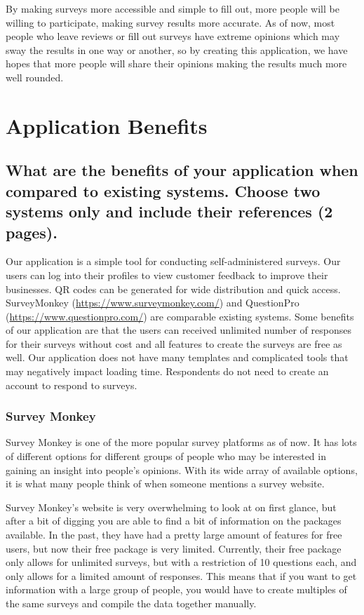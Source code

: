 \documentclass[letterpaper, 12 pt, conference]{ieeeconf}
\begin{document}
By making surveys more accessible and simple to fill out, more people will be willing to participate, making survey results more accurate. As of now, most people who leave reviews or fill out surveys have extreme opinions which may sway the results in one way or another, so by creating this application, we have hopes that more people will share their opinions making the results much more well rounded.


\newpage    
\section{Application Benefits}
\subsection{What are the benefits of your application when compared to existing systems. Choose two systems only and include their references (2 pages).}
\linebreak
Our application is a simple tool for conducting self-administered surveys. Our users can log into their profiles to view customer feedback to improve their businesses. QR codes can be generated for wide distribution and quick access. SurveyMonkey (\url{https://www.surveymonkey.com/}) and QuestionPro (\url{https://www.questionpro.com/}) are comparable existing systems. Some benefits of our application are that the users can received unlimited number of responses for their surveys without cost and all features to create the surveys are free as well. Our application does not have many templates and complicated tools that may negatively impact loading time. Respondents do not need to create an account to respond to surveys. 
\hfill \break

\subsubsection*{Survey Monkey}

Survey Monkey is one of the more popular survey platforms as of now. It has lots of different options for different groups of people who may be interested in gaining an insight into people's opinions. With its wide array of available options, it is what many people think of when someone mentions a survey website.
\newline

Survey Monkey's website is very overwhelming to look at on first glance, but after a bit of digging you are able to find a bit of information on the packages available. In the past, they have had a pretty large amount of features for free users, but now their free package is very limited. Currently, their free package only allows for unlimited surveys, but with a restriction of 10 questions each, and only allows for a limited amount of responses. This means that if you want to get information with a large group of people, you would have to create multiples of the same surveys and compile the data together manually.
\end{document}
